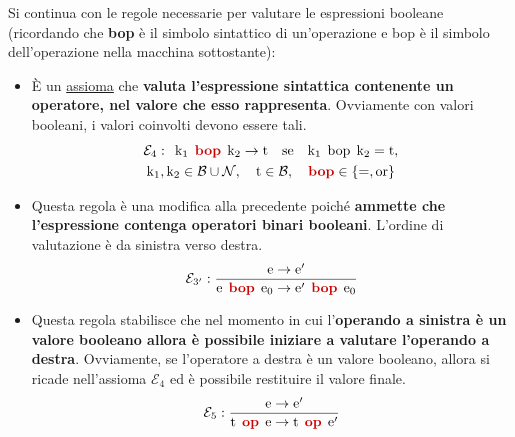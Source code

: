 \documentclass[a4paper]{article}
\begin{document}
	\newpage
	
	\noindent
	Si continua con le regole necessarie per valutare le espressioni booleane (ricordando che \textbf{bop} è il simbolo sintattico di un'operazione e bop è il simbolo dell'operazione nella macchina sottostante):
	\begin{itemize}
		\item È un \underline{assioma} che \textbf{valuta l'espressione sintattica contenente un operatore, nel valore che esso rappresenta}. Ovviamente con valori booleani, i valori coinvolti devono essere tali.
		\begin{gather*}
			\mathcal{E}_{4} : \:\: \mathrm{k}_{1} \:\: \textcolor{Red3}{\mathbf{bop}} \:\: \mathrm{k}_{2} \rightarrow \mathrm{t} \hspace{1em} \mathrm{se} \hspace{1em} \mathrm{k}_{1} \:\: \mathrm{bop} \:\: \mathrm{k}_{2} = \mathrm{t}, \\
			\mathrm{k_{1}, k_{2}} \in \mathcal{B} \cup \mathcal{N}, \hspace{1em} \mathrm{t} \in \mathcal{B}, \hspace{1em} \textcolor{Red3}{\mathbf{bop}} \in \left\{=, \mathrm{or}\right\}
		\end{gather*}
		
		\item Questa regola è una modifica alla precedente poiché \textbf{ammette che l'espressione contenga operatori binari booleani}. L'ordine di valutazione è da sinistra verso destra.
		\begin{equation*}
			\mathcal{E}_{3'} : \dfrac{
				\mathrm{e} \rightarrow \mathrm{e}'
			}{
				\mathrm{e} \:\: \textcolor{Red3}{\mathbf{bop}} \:\: \mathrm{e}_{0} \rightarrow \mathrm{e}' \:\: \textcolor{Red3}{\mathbf{bop}} \:\: \mathrm{e}_{0}
			}
		\end{equation*}
		
		\item Questa regola stabilisce che nel momento in cui l'\textbf{operando a sinistra è un valore booleano allora è possibile iniziare a valutare l'operando a destra}. Ovviamente, se l'operatore a destra è un valore booleano, allora si ricade nell'assioma $\mathcal{E}_{4}$ ed è possibile restituire il valore finale.
		\begin{equation*}
			\mathcal{E}_{5} : \dfrac{
				\mathrm{e} \rightarrow \mathrm{e}'
			}{
				\mathrm{t} \:\: \textcolor{Red3}{\mathbf{op}} \:\: \mathrm{e} \rightarrow \mathrm{t} \:\: \textcolor{Red3}{\mathbf{op}} \:\: \mathrm{e}'
			}
		\end{equation*}
		

\end{itemize}
\end{document}
